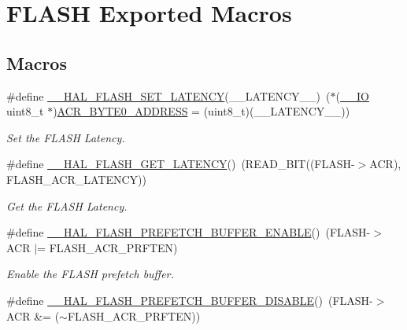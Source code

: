 \hypertarget{group___f_l_a_s_h___exported___macros}{}\section{F\+L\+A\+SH Exported Macros}
\label{group___f_l_a_s_h___exported___macros}
\subsection*{Macros}
\begin{DoxyCompactItemize}
\item 
\#define \hyperlink{group___f_l_a_s_h___exported___macros_gac1c9f459b798cc3700b90a6245df5a1a}{\+\_\+\+\_\+\+H\+A\+L\+\_\+\+F\+L\+A\+S\+H\+\_\+\+S\+E\+T\+\_\+\+L\+A\+T\+E\+N\+CY}(\+\_\+\+\_\+\+L\+A\+T\+E\+N\+C\+Y\+\_\+\+\_\+)~($\ast$(\hyperlink{core__sc300_8h_aec43007d9998a0a0e01faede4133d6be}{\+\_\+\+\_\+\+IO} uint8\+\_\+t $\ast$)\hyperlink{group___f_l_a_s_h___private___constants_gaeaca61fbcff69df08100280868bff214}{A\+C\+R\+\_\+\+B\+Y\+T\+E0\+\_\+\+A\+D\+D\+R\+E\+SS} = (uint8\+\_\+t)(\+\_\+\+\_\+\+L\+A\+T\+E\+N\+C\+Y\+\_\+\+\_\+))
\begin{DoxyCompactList}\small\item\em Set the F\+L\+A\+SH Latency. \end{DoxyCompactList}\item 
\#define \hyperlink{group___f_l_a_s_h___exported___macros_gaa537e44d74ce35ff5bfef80edf03f895}{\+\_\+\+\_\+\+H\+A\+L\+\_\+\+F\+L\+A\+S\+H\+\_\+\+G\+E\+T\+\_\+\+L\+A\+T\+E\+N\+CY}()~(R\+E\+A\+D\+\_\+\+B\+IT((F\+L\+A\+SH-\/$>$A\+CR), F\+L\+A\+S\+H\+\_\+\+A\+C\+R\+\_\+\+L\+A\+T\+E\+N\+CY))
\begin{DoxyCompactList}\small\item\em Get the F\+L\+A\+SH Latency. \end{DoxyCompactList}\item 
\#define \hyperlink{group___f_l_a_s_h___exported___macros_gad36059641057f824516303ea92734e6f}{\+\_\+\+\_\+\+H\+A\+L\+\_\+\+F\+L\+A\+S\+H\+\_\+\+P\+R\+E\+F\+E\+T\+C\+H\+\_\+\+B\+U\+F\+F\+E\+R\+\_\+\+E\+N\+A\+B\+LE}()~(F\+L\+A\+SH-\/$>$A\+CR $\vert$= F\+L\+A\+S\+H\+\_\+\+A\+C\+R\+\_\+\+P\+R\+F\+T\+EN)
\begin{DoxyCompactList}\small\item\em Enable the F\+L\+A\+SH prefetch buffer. \end{DoxyCompactList}\item 
\#define \hyperlink{group___f_l_a_s_h___exported___macros_ga646a4cb92e85659334d14a8c78f0ede8}{\+\_\+\+\_\+\+H\+A\+L\+\_\+\+F\+L\+A\+S\+H\+\_\+\+P\+R\+E\+F\+E\+T\+C\+H\+\_\+\+B\+U\+F\+F\+E\+R\+\_\+\+D\+I\+S\+A\+B\+LE}()~(F\+L\+A\+SH-\/$>$A\+CR \&= ($\sim$F\+L\+A\+S\+H\+\_\+\+A\+C\+R\+\_\+\+P\+R\+F\+T\+EN))

\end{DoxyCompactItemize}
